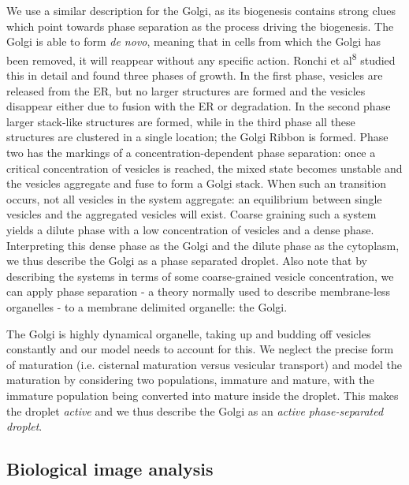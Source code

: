 \documentclass{Dissertate}
\begin{document}
We use a similar description for the Golgi, as its
biogenesis contains strong clues which point towards phase separation as the process driving the biogenesis. The Golgi is able to form \emph{de novo}, meaning
that in cells from which the Golgi has been removed, it will reappear
without any specific action. Ronchi et al\textsuperscript{8} studied
this in detail and found three phases of growth. In the first phase,
vesicles are released from the ER, but no larger structures are formed
and the vesicles disappear either due to fusion with the ER or
degradation. In the second phase larger stack-like structures are
formed, while in the third phase all these structures are clustered in a
single location; the Golgi Ribbon is formed. Phase two has the markings
of a concentration-dependent phase separation: once a critical
concentration of vesicles is reached, the mixed state becomes unstable and the vesicles aggregate and fuse to form a Golgi stack. When such an transition occurs, not all vesicles in the system aggregate: an equilibrium between single vesicles and the aggregated vesicles will exist. Coarse graining such a system yields a dilute phase with a low concentration of vesicles and a dense phase. Interpreting this dense phase as the Golgi and the dilute phase as the cytoplasm, we thus describe the Golgi as a phase separated droplet.  Also note that by describing the systems in terms of some coarse-grained vesicle concentration, we can apply phase separation - a theory normally used to describe membrane-less organelles - to a membrane delimited organelle: the Golgi. 

The Golgi is highly dynamical organelle, taking up and budding off vesicles constantly and our model needs to account for this. We neglect the precise form of maturation (i.e. cisternal maturation versus vesicular transport)
and model the maturation by considering two populations, immature and mature, with the immature population being converted into mature inside the droplet. This makes the droplet \emph{active} and we thus describe the Golgi as an \emph{active phase-separated
droplet}.

\hypertarget{biological-image-analysis}{%
\subsection{Biological image analysis}\label{biological-image-analysis}}
\end{document}
